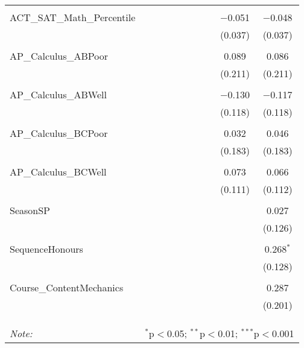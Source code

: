 \begin{table}[!htbp]
\begin{tabular}{@{\extracolsep{5pt}}lccccccccc}
  & & & & & & & & & \\ 
 ACT\_SAT\_Math\_Percentile &  &  &  &  &  &  &  & $-$0.051 & $-$0.048 \\ 
  &  &  &  &  &  &  &  & (0.037) & (0.037) \\ 
  & & & & & & & & & \\ 
 AP\_Calculus\_ABPoor &  &  &  &  &  &  &  & 0.089 & 0.086 \\ 
  &  &  &  &  &  &  &  & (0.211) & (0.211) \\ 
  & & & & & & & & & \\ 
 AP\_Calculus\_ABWell &  &  &  &  &  &  &  & $-$0.130 & $-$0.117 \\ 
  &  &  &  &  &  &  &  & (0.118) & (0.118) \\ 
  & & & & & & & & & \\ 
 AP\_Calculus\_BCPoor &  &  &  &  &  &  &  & 0.032 & 0.046 \\ 
  &  &  &  &  &  &  &  & (0.183) & (0.183) \\ 
  & & & & & & & & & \\ 
 AP\_Calculus\_BCWell &  &  &  &  &  &  &  & 0.073 & 0.066 \\ 
  &  &  &  &  &  &  &  & (0.111) & (0.112) \\ 
  & & & & & & & & & \\ 
 SeasonSP &  &  &  &  &  &  &  &  & 0.027 \\ 
  &  &  &  &  &  &  &  &  & (0.126) \\ 
  & & & & & & & & & \\ 
 SequenceHonours &  &  &  &  &  &  &  &  & 0.268$^{*}$ \\ 
  &  &  &  &  &  &  &  &  & (0.128) \\ 
  & & & & & & & & & \\ 
 Course\_ContentMechanics &  &  &  &  &  &  &  &  & 0.287 \\ 
  &  &  &  &  &  &  &  &  & (0.201) \\ 
  & & & & & & & & & \\ 
\hline \\[-1.8ex] 
\hline 
\hline \\[-1.8ex] 
\textit{Note:}  & \multicolumn{9}{r}{$^{*}$p$<$0.05; $^{**}$p$<$0.01; $^{***}$p$<$0.001} \\ 
\end{tabular} 
\end{table} 
